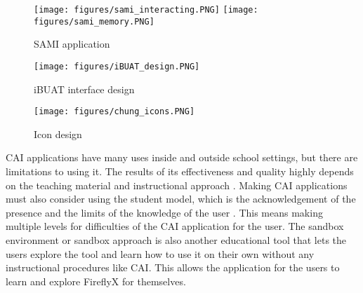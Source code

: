 \begin{figure}[H]
    \centering
    \texttt{[image: figures/sami\_interacting.PNG]}
    \texttt{[image: figures/sami\_memory.PNG]}
    \caption{SAMI application \protect\cite{paule2017music}}
    \label{fig:sami_memory}
\end{figure}


\begin{figure}[H]
    \centering
    \texttt{[image: figures/iBUAT\_design.PNG]}
    \caption{iBUAT interface design \protect\cite{ibharim2014ibuat}}
    \label{fig:iBuAT_ui}
\end{figure}


\begin{figure}[H]
    \centering
    \texttt{[image: figures/chung\_icons.PNG]}
    \caption{Icon design \protect\cite{chung2017designing}}
    \label{fig:ICON_DES}
\end{figure}

CAI applications have many uses inside and outside school settings, but there are limitations to using it. The results of its effectiveness and quality highly depends on the teaching material and instructional approach \cite{aqda2011comparative}. Making CAI applications must also consider using the student model, which is the acknowledgement of the presence and the limits of the knowledge of the user \cite{self1974student}. This means making multiple levels for difficulties of the CAI application for the user. The sandbox environment or sandbox approach is also another educational tool that lets the users explore the tool and learn how to use it on their own without any instructional procedures like CAI. This allows the application for the users to learn and explore FireflyX for themselves.

